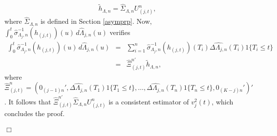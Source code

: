 \documentclass{statsoc}
\begin{document}
\begin{eqnarray*}
\widetilde h_{\Lambda,n}=\widehat\Sigma_{\Lambda,n} U_{(j,t)}^n,
\end{eqnarray*}
where $\widehat\Sigma_{\Lambda,n} $ is defined in Section \ref{asymprp}. Now, $\int_0^t\widehat \sigma_{\Lambda_j,n}^{-1}(h_{(j,t)})(u)\,d\widehat\Lambda_{j,n}(u)$ verifies
\begin{eqnarray*}
\int_0^t\widehat \sigma_{\Lambda_j,n}^{-1}(h_{(j,t)})(u)\,d\widehat\Lambda_{j,n}(u)&=&\sum_{i=1}^n \widehat \sigma_{\Lambda_j, n}^{-1}(h_{(j,t)})(T_i)\widehat{\Delta \Lambda_{j,n}}(T_i) 1\{T_i\leq t\} \\
&=& \widehat\Xi_{(j,t)}^{n'}\widetilde h_{\Lambda,n},
\end{eqnarray*}
where $\widehat\Xi_{(j,t)}^n=\left(0_{(j-1)n}',\widehat{\Delta \Lambda_{j,n}}(T_1) 1\{T_1\leq t\},\ldots,\widehat{\Delta \Lambda_{j,n}}(T_n) 1\{T_n\leq t\},0_{(K-j)n}'\right)'$. It follows that $\widehat\Xi_{(j,t)}^{n'}\widehat\Sigma_{\Lambda,n} U_{(j,t)}^n$ is a consistent estimator of $v_j^2(t)$, which concludes the proof.
\\
\\
$\Box$


\end{document}
